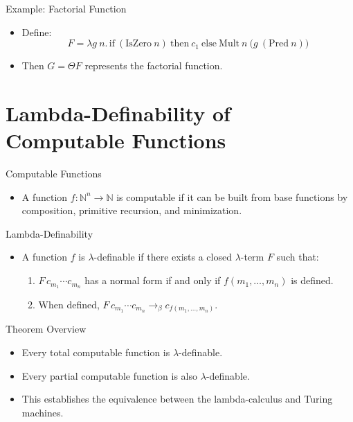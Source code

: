 \documentclass{beamer}
\begin{document}
\begin{frame}{Example: Factorial Function}
  \begin{itemize}
    \item Define:
      \[
      F = \lambda g\ n.\, \text{if}\ (\text{IsZero}\ n)\ \text{then}\ c_1\ \text{else}\ \text{Mult}\ n\ \bigl(g\ (\text{Pred}\ n)\bigr)
      \]
    \item Then \(G = \Theta F\) represents the factorial function.
  \end{itemize}
  \vspace{-0.5em} %
\end{frame}

\section{Lambda-Definability of Computable Functions}
\begin{frame}{Computable Functions}
  \begin{itemize}
    \item A function \(f : \mathbb{N}^n \rightarrow \mathbb{N}\) is computable if it can be built from base functions by composition, primitive recursion, and minimization.
  \end{itemize}
\end{frame}

\begin{frame}{Lambda-Definability}
  \begin{itemize}
    \item A function \(f\) is \(\lambda\)-definable if there exists a closed \(\lambda\)-term \(F\) such that:
      \begin{enumerate}
        \item \(F\,c_{m_1}\cdots c_{m_n}\) has a normal form if and only if \(f(m_1,\dots,m_n)\) is defined.
        \item When defined, \(F\,c_{m_1}\cdots c_{m_n} \rightarrow_\beta c_{f(m_1,\dots,m_n)}\).
      \end{enumerate}
  \end{itemize}
\end{frame}

\begin{frame}{Theorem Overview}
  \begin{itemize}
    \item Every total computable function is \(\lambda\)-definable.
    \item Every partial computable function is also \(\lambda\)-definable.
    \item This establishes the equivalence between the lambda-calculus and Turing machines.
  \end{itemize}
\end{frame}
\end{document}
